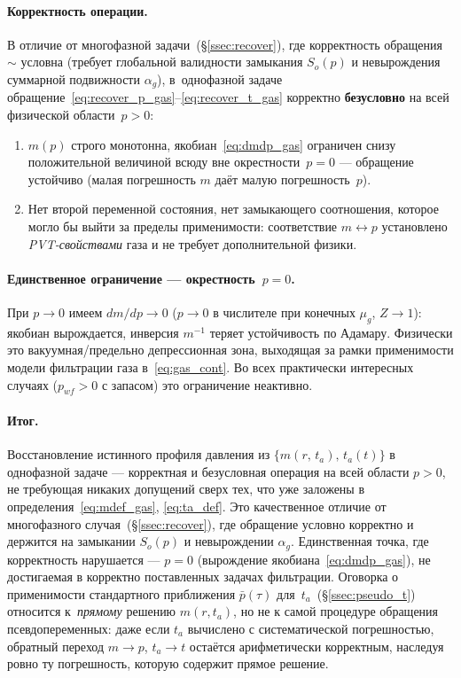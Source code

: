 ﻿\documentclass[12pt,a4paper]{article}
\begin{document}
\paragraph{Корректность операции.}
В отличие от многофазной задачи~(\S\ref{ssec:recover}),
где корректность обращения $\sim$ условна (требует
глобальной валидности замыкания $S_o(p)$ и невырождения
суммарной подвижности $\alpha_g$), в~однофазной задаче
обращение~\eqref{eq:recover_p_gas}--\eqref{eq:recover_t_gas}
корректно \textbf{безусловно} на всей физической
области~$p > 0$:
\begin{enumerate}[nosep]
\item $m(p)$ строго монотонна, якобиан~\eqref{eq:dmdp_gas}
ограничен снизу положительной величиной всюду вне
окрестности~$p = 0$ --- обращение устойчиво
(малая погрешность $m$ даёт малую погрешность~$p$).
\item Нет второй переменной состояния, нет замыкающего
соотношения, которое могло бы выйти за пределы
применимости: соответствие $m \leftrightarrow p$
установлено \emph{PVT-свойствами} газа и не требует
дополнительной физики.
\end{enumerate}

\paragraph{Единственное ограничение --- окрестность~$p = 0$.}
При $p \to 0$ имеем $dm/dp \to 0$ ($p \to 0$ в числителе
при конечных $\mu_g$, $Z \to 1$): якобиан вырождается,
инверсия $m^{-1}$ теряет устойчивость по Адамару.
Физически это вакуумная/предельно депрессионная зона,
выходящая за рамки применимости модели фильтрации газа
в~\eqref{eq:gas_cont}. Во всех практически интересных
случаях ($p_{wf} > 0$ с запасом) это ограничение неактивно.

\paragraph{Итог.}
Восстановление истинного профиля давления из
$\{m(r,\,t_a),\,t_a(t)\}$ в однофазной задаче ---
корректная и безусловная операция на всей области $p > 0$,
не требующая никаких допущений сверх тех, что уже заложены
в определения~\eqref{eq:mdef_gas}, \eqref{eq:ta_def}.
Это качественное отличие от многофазного случая~(\S\ref{ssec:recover}),
где обращение условно корректно и держится на замыкании
$S_o(p)$ и невырождении $\alpha_g$.
Единственная точка, где корректность нарушается ---
$p = 0$ (вырождение якобиана~\eqref{eq:dmdp_gas}),
не достигаемая в корректно поставленных задачах фильтрации.
Оговорка о применимости стандартного приближения
$\bar p(\tau)$ для~$t_a$~(\S\ref{ssec:pseudo_t}) относится
к~\emph{прямому} решению $m(r,t_a)$, но не к самой
процедуре обращения псевдопеременных: даже если
$t_a$ вычислено с систематической погрешностью,
обратный переход $m \to p$, $t_a \to t$ остаётся
арифметически корректным, наследуя ровно ту погрешность,
которую содержит прямое решение.
\end{document}
